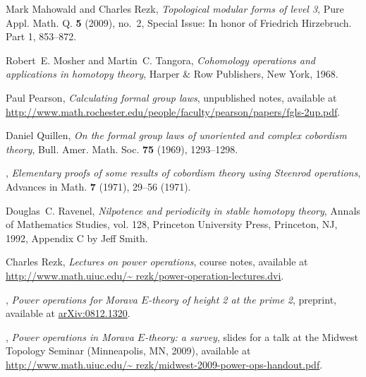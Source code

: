 \documentclass{gtpart}
\theoremstyle{definition}
\theoremstyle{remark}
\numberwithin{equation}{section}
\numberwithin{thm}{section}
\begin{document}
\begin{thebibliography}
Mark Mahowald and Charles Rezk, \emph{Topological modular forms of level 3},
  Pure Appl. Math. Q. \textbf{5} (2009), no.~2, Special Issue: In honor of
  Friedrich Hirzebruch. Part 1, 853--872. 

Robert~E. Mosher and Martin~C. Tangora, \emph{Cohomology operations and
  applications in homotopy theory}, Harper \& Row Publishers, New York, 1968.

Paul Pearson, \emph{Calculating formal group laws}, unpublished notes,
  available at
  \href{http://www.math.rochester.edu/people/faculty/pearson/papers/fgls-2up.pdf}{http://\linebreak www.math.rochester.edu/people/faculty/pearson/papers/fgls-2up.pdf}.

Daniel Quillen, \emph{On the formal group laws of unoriented and complex
  cobordism theory}, Bull. Amer. Math. Soc. \textbf{75} (1969), 1293--1298.

\bysame, \emph{Elementary proofs of some results of cobordism theory using
  {S}teenrod operations}, Advances in Math. \textbf{7} (1971), 29--56 (1971).

Douglas~C. Ravenel, \emph{Nilpotence and periodicity in stable homotopy
  theory}, Annals of Mathematics Studies, vol. 128, Princeton University Press,
  Princeton, NJ, 1992, Appendix C by Jeff Smith. 

Charles Rezk, \emph{Lectures on power operations}, course notes, available at
  \href{http://www.math.uiuc.edu/~rezk/power-operation-lectures.dvi}{http://www.\linebreak math.uiuc.edu/\textasciitilde
  rezk/power-operation-lectures.dvi}.

\bysame, \emph{Power operations for {M}orava ${E}$-theory of height 2 at the
  prime 2}, preprint, available at
  \href{http://arxiv.org/abs/0812.1320}{arXiv:0812.1320}.

\bysame, \emph{Power operations in {M}orava ${E}$-theory: a survey}, slides for
  a talk at the Midwest Topology Seminar (Minneapolis, MN, 2009), available at
  \href{http://www.math.uiuc.edu/~rezk/midwest-2009-power-ops-handout.pdf}{http://www.\linebreak math.uiuc.edu/\textasciitilde
  rezk/midwest-2009-power-ops-handout.pdf}.


\end{thebibliography}
\end{document}
